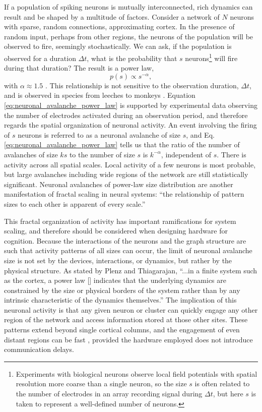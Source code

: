 \documentclass[twocolumn]{article}
\begin{document}
If a population of spiking neurons is mutually interconnected, rich dynamics can result and be shaped by a multitude of factors. Consider a network of $N$ neurons with sparse, random connections, approximating cortex. In the presence of random input, perhaps from other regions, the neurons of the population will be observed to fire, seemingly stochastically. We can ask, if the population is observed for a duration $\Delta t$, what is the probability that $s$ neurons\footnote{Experiments with biological neurons observe local field potentials with spatial resolution more coarse than a single neuron, so the size $s$ is often related to the number of electrodes in an array recording signal during $\Delta t$, but here $s$ is taken to represent a well-defined number of neurons.} will fire during that duration? The result is a power law,
\begin{equation}
\label{eq:neuronal_avalanche_power_law}
p(s) \propto s^{-\alpha},
\end{equation}
with $\alpha \approx 1.5$ \cite{plth2006,be2007}. This relationship is not sensitive to the observation duration, $\Delta t$, and is observed in species from leeches \cite{be2007} to monkeys \cite{peth2009}. Equation \ref{eq:neuronal_avalanche_power_law} is supported by experimental data observing the number of electrodes activated during an observation period, and therefore regards the spatial organization of neuronal activity. An event involving the firing of $s$ neurons is referred to as a neuronal avalanche \cite{bepl2003} of size $s$, and Eq.\,\ref{eq:neuronal_avalanche_power_law} tells us that the ratio of the number of avalanches of size $ks$ to the number of size $s$ is $k^{-\alpha}$, independent of $s$. There is activity across all spatial scales. Local activity of a few neurons is most probable, but large avalanches including wide regions of the network are still statistically significant. Neuronal avalanches of power-law size distribution are another manifestation of fractal scaling in neural systems: ``the relationship of pattern sizes to each other is apparent of every scale.'' \cite{plth2006} 

This fractal organization of activity has important ramifications for system scaling, and therefore should be considered when designing hardware for cognition. Because the interactions of the neurons and the graph structure are such that activity patterns of all sizes can occur, the limit of neuronal avalanche size is not set by the devices, interactions, or dynamics, but rather by the physical structure. As stated by Plenz and Thiagarajan, ``...in a finite system such as the cortex, a power law [] indicates that the underlying dynamics are constrained by the size or physical borders of the system rather than by any intrinsic characteristic of the dynamics themselves.'' \cite{plth2006} The implication of this neuronal activity is that any given neuron or cluster can quickly engage any other region of the network and access information stored at those other sites. These patterns extend beyond single cortical columns, and the engagement of even distant regions can be fast \cite{plth2006}, provided the hardware employed does not introduce communication delays.
\end{document}
